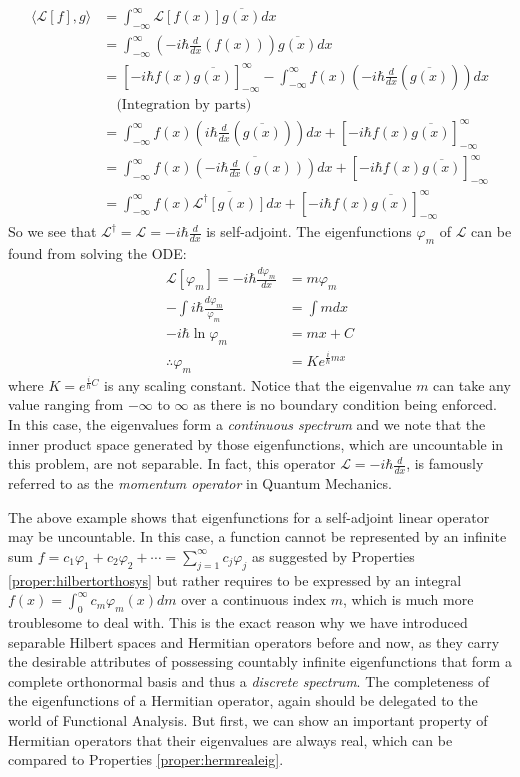 \begin{solution}
\begin{align*}
\langle \mathcal{L}[f], g \rangle &= \int_{-\infty}^\infty \mathcal{L}[f(x)] \overline{g(x)} dx \\
&= \int_{-\infty}^\infty \left(-i \hbar\frac{d}{dx}(f(x))\right) \overline{g(x)} dx \\
&= [-i\hbar f(x)\overline{g(x)}]_{-\infty}^\infty - \int_{-\infty}^\infty f(x) \left(-i\hbar\frac{d}{dx}(\overline{g(x)})\right) dx \\
&\quad \text{(Integration by parts)} \\
&= \int_{-\infty}^\infty f(x) \left(i\hbar\frac{d}{dx}(\overline{g(x)})\right) dx + [-i\hbar f(x)\overline{g(x)}]_{-\infty}^\infty \\
&= \int_{-\infty}^\infty f(x) \overline{\left(-i\hbar\frac{d}{dx}(g(x))\right)} dx + [-i\hbar f(x)\overline{g(x)}]_{-\infty}^\infty \\
&= \int_{-\infty}^\infty f(x) \overline{\mathcal{L}^\dag[g(x)]} dx + [-i\hbar f(x)\overline{g(x)}]_{-\infty}^\infty
\end{align*}
So we see that $\mathcal{L}^\dag = \mathcal{L} = -i\hbar\frac{d}{dx}$ is self-adjoint. The eigenfunctions $\varphi_m$ of $\mathcal{L}$ can be found from solving the ODE:
\begin{align*}
\mathcal{L}[\varphi_m] = -i \hbar\frac{d\varphi_m}{dx} &= m\varphi_m \\
-\int i \hbar \frac{d\varphi_m}{\varphi_m} &= \int m dx \\
- i \hbar \ln{\varphi_m} &= mx + C \\
\therefore \varphi_m &= Ke^{\frac{i}{\hbar}mx}
\end{align*}
where $K = e^{\frac{i}{\hbar} C}$ is any scaling constant. Notice that the eigenvalue $m$ can take any value ranging from $-\infty$ to $\infty$ as there is no boundary condition being enforced. In this case, the eigenvalues form a \textit{continuous spectrum} and we note that the inner product space generated by those eigenfunctions, which are uncountable in this problem, are not separable. In fact, this operator $\mathcal{L} = -i\hbar\frac{d}{dx}$, is famously referred to as the \textit{momentum operator} in Quantum Mechanics.
\end{solution}
The above example shows that eigenfunctions for a self-adjoint linear operator may be uncountable. In this case, a function cannot be represented by an infinite sum $f = c_1\varphi_1 + c_2\varphi_2 + \cdots = \sum_{j=1}^{\infty} c_j \varphi_j$ as suggested by Properties \ref{proper:hilbertorthosys} but rather requires to be expressed by an integral $f(x) = \int_0^\infty c_m\varphi_m(x) dm$ over a continuous index $m$, which is much more troublesome to deal with. This is the exact reason why we have introduced separable Hilbert spaces and Hermitian operators before and now, as they carry the desirable attributes of possessing countably infinite eigenfunctions that form a complete orthonormal basis and thus a \textit{discrete spectrum}. The completeness of the eigenfunctions of a Hermitian operator, again should be delegated to the world of Functional Analysis. But first, we can show an important property of Hermitian operators that their eigenvalues are always real, which can be compared to Properties \ref{proper:hermrealeig}.
